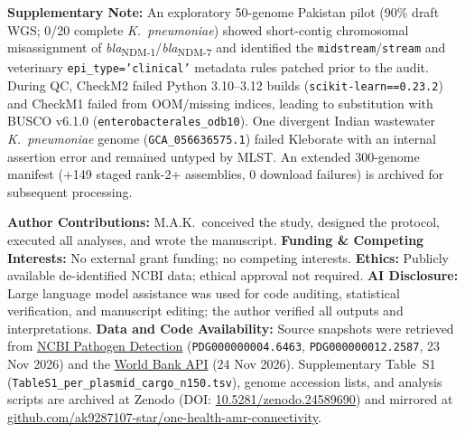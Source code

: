 \documentclass[11pt,a4paper]{article}
\begin{document}
\noindent\textbf{Supplementary Note:} An exploratory 50-genome Pakistan pilot (90\% draft WGS; 0/20 complete \textit{K.~pneumoniae}) showed short-contig chromosomal misassignment of \textit{bla}\textsubscript{NDM-1}/\textit{bla}\textsubscript{NDM-7} and identified the \texttt{midstream}/\texttt{stream} and veterinary \texttt{epi\_type='clinical'} metadata rules patched prior to the audit. During QC, CheckM2 failed Python 3.10--3.12 builds (\texttt{scikit-learn==0.23.2}) and CheckM1 failed from OOM/missing indices, leading to substitution with BUSCO v6.1.0 (\texttt{enterobacterales\_odb10}). One divergent Indian wastewater \textit{K.~pneumoniae} genome (\texttt{GCA\_056636575.1}) failed Kleborate with an internal assertion error and remained untyped by MLST. An extended 300-genome manifest (+149 staged rank-2+ assemblies, 0 download failures) is archived for subsequent processing.

\noindent\textbf{Author Contributions:} M.A.K.\ conceived the study, designed the protocol, executed all analyses, and wrote the manuscript. \textbf{Funding \& Competing Interests:} No external grant funding; no competing interests. \textbf{Ethics:} Publicly available de-identified NCBI data; ethical approval not required. \textbf{AI Disclosure:} Large language model assistance was used for code auditing, statistical verification, and manuscript editing; the author verified all outputs and interpretations. \textbf{Data and Code Availability:} Source snapshots were retrieved from \href{https://www.ncbi.nlm.nih.gov/pathogens/docs/isolates_gcp}{NCBI Pathogen Detection} (\texttt{PDG000000004.6463}, \texttt{PDG000000012.2587}, 23 Nov 2026) and the \href{https://api.worldbank.org/v2/country/all?format=json&per_page=300}{World Bank API} (24 Nov 2026). Supplementary Table~S1 (\texttt{TableS1\_per\_plasmid\_cargo\_n150.tsv}), genome accession lists, and analysis scripts are archived at Zenodo (DOI: \href{https://doi.org/10.5281/zenodo.24589690}{10.5281/zenodo.24589690}) and mirrored at \href{https://github.com/ak9287107-star/one-health-amr-connectivity}{github.com/ak9287107-star/one-health-amr-connectivity}.



\end{document}
